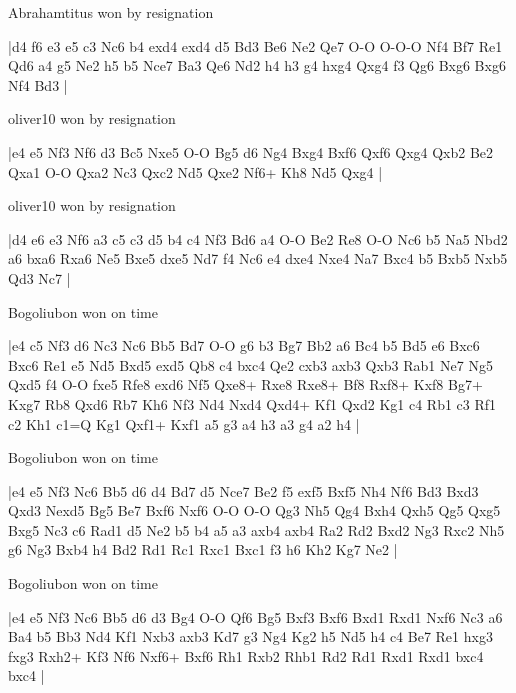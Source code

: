 \showboard

Abrahamtitus won by resignation

\makegametitle
|d4 f6 e3 e5 c3 Nc6 b4 exd4 exd4 d5 Bd3 Be6 Ne2 Qe7 O-O O-O-O Nf4 Bf7 Re1 Qd6 a4 g5 Ne2 h5 b5 Nce7 Ba3 Qe6 Nd2 h4 h3 g4 hxg4 Qxg4 f3 Qg6 Bxg6 Bxg6 Nf4 Bd3  |

\showboard

oliver10 won by resignation

\makegametitle
|e4 e5 Nf3 Nf6 d3 Bc5 Nxe5 O-O Bg5 d6 Ng4 Bxg4 Bxf6 Qxf6 Qxg4 Qxb2 Be2 Qxa1 O-O Qxa2 Nc3 Qxc2 Nd5 Qxe2 Nf6+ Kh8 Nd5 Qxg4  |

\showboard

oliver10 won by resignation

\makegametitle
|d4 e6 e3 Nf6 a3 c5 c3 d5 b4 c4 Nf3 Bd6 a4 O-O Be2 Re8 O-O Nc6 b5 Na5 Nbd2 a6 bxa6 Rxa6 Ne5 Bxe5 dxe5 Nd7 f4 Nc6 e4 dxe4 Nxe4 Na7 Bxc4 b5 Bxb5 Nxb5 Qd3 Nc7  |

\showboard

Bogoliubon won on time

\makegametitle
|e4 c5 Nf3 d6 Nc3 Nc6 Bb5 Bd7 O-O g6 b3 Bg7 Bb2 a6 Bc4 b5 Bd5 e6 Bxc6 Bxc6 Re1 e5 Nd5 Bxd5 exd5 Qb8 c4 bxc4 Qe2 cxb3 axb3 Qxb3 Rab1 Ne7 Ng5 Qxd5 f4 O-O fxe5 Rfe8 exd6 Nf5 Qxe8+ Rxe8 Rxe8+ Bf8 Rxf8+ Kxf8 Bg7+ Kxg7 Rb8 Qxd6 Rb7 Kh6 Nf3 Nd4 Nxd4 Qxd4+ Kf1 Qxd2 Kg1 c4 Rb1 c3 Rf1 c2 Kh1 c1=Q Kg1 Qxf1+ Kxf1 a5 g3 a4 h3 a3 g4 a2 h4  |

\showboard

Bogoliubon won on time

\makegametitle
|e4 e5 Nf3 Nc6 Bb5 d6 d4 Bd7 d5 Nce7 Be2 f5 exf5 Bxf5 Nh4 Nf6 Bd3 Bxd3 Qxd3 Nexd5 Bg5 Be7 Bxf6 Nxf6 O-O O-O Qg3 Nh5 Qg4 Bxh4 Qxh5 Qg5 Qxg5 Bxg5 Nc3 c6 Rad1 d5 Ne2 b5 b4 a5 a3 axb4 axb4 Ra2 Rd2 Bxd2 Ng3 Rxc2 Nh5 g6 Ng3 Bxb4 h4 Bd2 Rd1 Rc1 Rxc1 Bxc1 f3 h6 Kh2 Kg7 Ne2  |

\showboard

Bogoliubon won on time

\makegametitle
|e4 e5 Nf3 Nc6 Bb5 d6 d3 Bg4 O-O Qf6 Bg5 Bxf3 Bxf6 Bxd1 Rxd1 Nxf6 Nc3 a6 Ba4 b5 Bb3 Nd4 Kf1 Nxb3 axb3 Kd7 g3 Ng4 Kg2 h5 Nd5 h4 c4 Be7 Re1 hxg3 fxg3 Rxh2+ Kf3 Nf6 Nxf6+ Bxf6 Rh1 Rxb2 Rhb1 Rd2 Rd1 Rxd1 Rxd1 bxc4 bxc4  |

